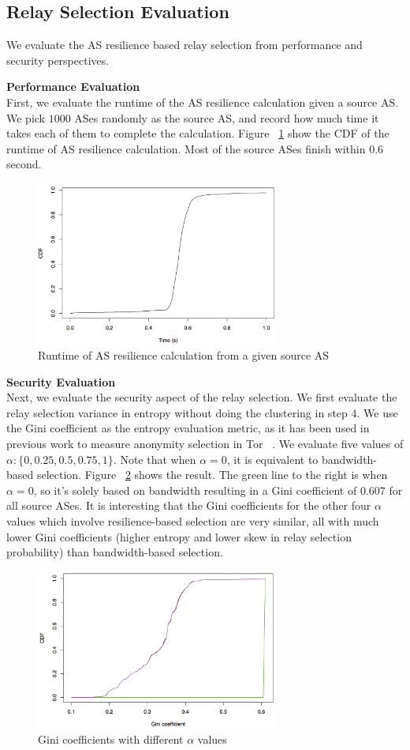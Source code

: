 \subsection{Relay Selection Evaluation}

We evaluate the AS resilience based relay selection from performance and security perspectives. 

\textbf{Performance Evaluation}\\
First, we evaluate the runtime of the AS resilience calculation given a source AS. We pick $1000$ ASes randomly as the source AS, and record how much time it takes each of them to complete the calculation. Figure ~\ref{fig_ascal} show the CDF of the runtime of AS resilience calculation. Most of the source ASes finish within $0.6$ second. 

\begin{figure}[ht!]
\centering
\includegraphics[width=80mm]{figure/runtime}
\caption{Runtime of AS resilience calculation from a given source AS \label{fig_ascal}}
\end{figure}

\textbf{Security Evaluation}\\
Next, we evaluate the security aspect of the relay selection. We first evaluate the relay selection variance in entropy without doing the clustering in step 4. We use the Gini coefficient as the entropy evaluation metric, as it has been used in previous work to measure anonymity selection in Tor ~\cite{akhoondi2012lastor}. We evaluate five values of $\alpha: \{0, 0.25, 0.5, 0.75, 1\}$. Note that when $\alpha = 0$, it is equivalent to bandwidth-based selection. Figure ~\ref{fig_gini} shows the result. The green line to the right is when $\alpha = 0$, so it's solely based on bandwidth resulting in a Gini coefficient of $0.607$ for all source ASes. It is interesting that the Gini coefficients for the other four $\alpha$ values which involve resilience-based selection are very similar, all with much lower Gini coefficients (higher entropy and lower skew in relay selection probability) than bandwidth-based selection. 

\begin{figure}[ht!]
\centering
\includegraphics[width=80mm]{figure/gini}
\caption{Gini coefficients with different $\alpha$ values \label{fig_gini}}
\end{figure}




